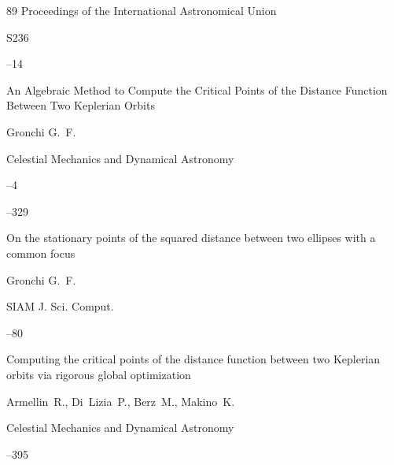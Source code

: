 \begin{thebibliography}{89}
\jour  Proceedings of the International Astronomical Union



\issue S236  

--14






\paper An Algebraic Method to Compute the Critical Points of the Distance Function Between Two Keplerian Orbits

\by Gronchi G.~F. 

\jour Celestial Mechanics and Dynamical Astronomy



--4

--329






\paper On the stationary points of the squared distance between two ellipses with a common focus

\by Gronchi G.~F. 

\jour SIAM J. Sci. Comput.




--80






\paper Computing the critical points of the distance function between two Keplerian orbits via rigorous global optimization

\by Armellin~R., Di~Lizia~P., Berz~M., Makino~K.

\jour Celestial Mechanics and Dynamical Astronomy




--395





\end{thebibliography}
